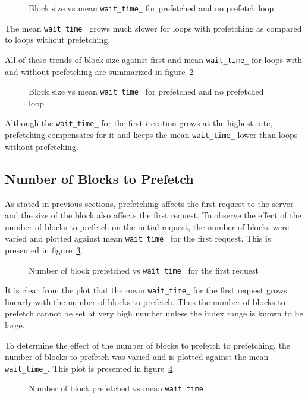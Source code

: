 \begin{figure}[h]
  
  \caption{Block size vs mean \texttt{wait\_time\_} for prefetched and no prefetch loop}
  \label{fig:block_size_avg_wait_time}
\end{figure}

The mean \texttt{wait\_time\_} grows much slower for loops with prefetching as compared
to loops without prefetching.

All of these trends of block size against first and mean \texttt{wait\_time\_} for
loops with and without prefetching are summarized in figure~\ref{fig:block_size_avg_all}
\begin{figure}[h]
  
  \caption{Block size vs mean \texttt{wait\_time\_} for prefetched and no prefetched loop}
  \label{fig:block_size_avg_all}
\end{figure}

Although the \texttt{wait\_time\_} for the first iteration grows at the highest rate,
prefetching compensates for it and keeps the mean \texttt{wait\_time\_} lower than
loops without prefetching.

\subsection{Number of Blocks to Prefetch}
As stated in previous sections, prefetching affects the first request to the server
and the size of the block also affects the first request. To observe the effect of
the number of blocks to prefetch on the initial request, the number of blocks were
varied and plotted against mean \texttt{wait\_time\_} for the first request. This is
presented in figure~\ref{fig:look_ahead_first_wait_time}.
\begin{figure}[h]
  
  \caption{Number of block prefetched vs \texttt{wait\_time\_} for the first request}
  \label{fig:look_ahead_first_wait_time}
\end{figure}

It is clear from the plot that the mean \texttt{wait\_time\_} for the first request
grows linearly with the number of blocks to prefetch. Thus the number of blocks
to prefetch cannot be set at very high number unless the index range is
known to be large.

To determine the effect of the number of blocks to prefetch to prefetching, the number
of blocks to prefetch was varied and is plotted against the mean \texttt{wait\_time\_}.
This plot is presented in figure~\ref{fig:look_ahead_avg_wait_time}.
\begin{figure}[h]
  
  \caption{Number of block prefetched vs mean \texttt{wait\_time\_}}
  \label{fig:look_ahead_avg_wait_time}
\end{figure}

